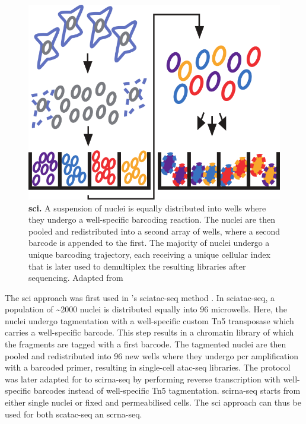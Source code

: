 \begin{figure}[ht]
\begin{minipage}[]{0.50\textwidth}
	\includegraphics[width=\textwidth]{./ims/cusanovich2015.png}
\end{minipage}\hfill
\begin{minipage}[]{0.45\textwidth}
	\caption[Single-cell combinatorial indexing]{\textbf{\Acrlong{sci}.} A suspension of nuclei is equally distributed into wells where they undergo a well-specific barcoding reaction. The nuclei are then pooled and redistributed into a second array of wells, where a second barcode is appended to the first. The majority of nuclei undergo a unique barcoding trajectory, each receiving a unique cellular index that is later used to demultiplex the resulting libraries after sequencing. Adapted from \cite{cusanovich2015}}
	\label{fig:cusanovich2015}
\end{minipage}
\end{figure}

The \acrshort{sci} approach was first used in \citeauthor{cusanovich2015}'s \acrfull{sciatac-seq} method \citep{cusanovich2015}. In \acrshort{sciatac-seq}, a population of {\textasciitilde}2000 nuclei is distributed equally into 96 microwells. Here, the nuclei undergo tagmentation with a well-specific custom Tn5 transposase which carries a well-specific barcode. This step results in a chromatin library of which the fragments are tagged with a first barcode. The tagmented nuclei are then pooled and redistributed into 96 new wells where they undergo \acrshort{pcr} amplification with a barcoded primer, resulting in single-cell \acrshort{atac-seq} libraries. The protocol was later adapted for to \acrshort{scirna-seq} \citep{cao2017} by performing reverse transcription with well-specific barcodes instead of well-specific Tn5 tagmentation. \acrshort{scirna-seq} starts from either single nuclei or fixed and permeabilised cells. The \acrshort{sci} approach can thus be used for both \acrshort{scatac-seq} an \acrshort{scrna-seq}.\pms

